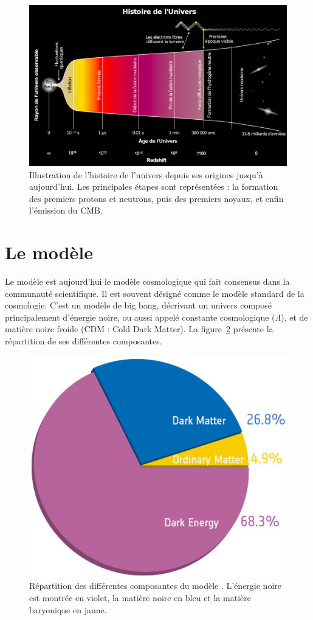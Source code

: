 \documentclass[11pt, twoside, a4paper, openright]{report}
\begin{document}
\begin{figure}
  \centering
  \includegraphics[scale=0.35]{univershistory2}
  \caption{Illustration de l'histoire de l'univers depuis ses origines jusqu'à aujourd'hui. Les principales étapes sont représentées : la formation des premiers protons et neutrons, puis des premiers noyaux, et enfin l'émission du CMB.}
  \label{fig:univershistory}
\end{figure}


\section{Le modèle \lcdm{}}

Le modèle \lcdm{} est aujourd'hui le modèle cosmologique qui fait consensus dans la communauté scientifique. Il est souvent désigné comme le modèle standard de la cosmologie. C'est un modèle de big bang, décrivant un univers composé principalement d'énergie noire, ou aussi appelé constante cosmologique ($\Lambda$), et de matière noire froide (CDM : Cold Dark Matter). La figure~\ref{fig:lcdm} présente la répartition de ses différentes composantes.
\begin{figure}
  \centering
  \includegraphics[scale=0.3]{lcdm}
  \caption{Répartition des différentes composantes du modèle \lcdm{}. L'énergie noire est montrée en violet, la matière noire en bleu et la matière baryonique en jaune.}
  \label{fig:lcdm}
\end{figure}
\end{document}

